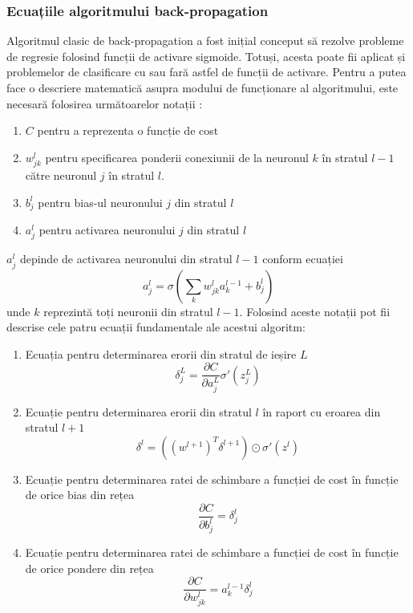 \subsubsection*{Ecuațiile algoritmului back-propagation}
Algoritmul clasic de back-propagation a fost inițial conceput să rezolve probleme de regresie folosind funcții de activare sigmoide. Totuși, acesta poate fii aplicat și problemelor de clasificare cu sau fară astfel de funcții de activare. Pentru a putea face o descriere matematică asupra modului de funcționare al algoritmului, este necesară folosirea următoarelor notații \cite{neuralnetbook:2015}:
\begin{enumerate}
\item $C$ pentru a reprezenta o funcție de cost
\item $w_{jk}^l$ pentru specificarea ponderii conexiunii de la neuronul $k$ în stratul $l-1$ către neuronul $j$ în stratul $l$.
\item $b_j^l$ pentru bias-ul neuronului $j$ din stratul $l$
\item $a_j^l$ pentru activarea neuronului $j$ din stratul $l$
\end{enumerate}
$a_j^l$ depinde de activarea neuronului din stratul $l-1$ conform ecuației
\begin{equation}
a_j^l=\sigma(\sum_k w_{jk}^l a_k^{l-1} + b_j^l)
\end{equation}
unde $k$ reprezintă toți neuronii din stratul $l-1$. Folosind aceste notații pot fii descrise cele patru ecuații fundamentale ale acestui algoritm:
\begin{enumerate}
\item Ecuația pentru determinarea erorii din stratul de ieșire $L$
\begin{equation}
\delta_j^L=\frac{\partial C}{\partial a_j^L}\sigma'(z_j^L)
\label{eq:out-err}
\end{equation}
\item Ecuație pentru determinarea erorii din stratul $l$ în raport cu eroarea din stratul $l+1$
\begin{equation}
\delta^l = ((w^{l+1})^T \delta^{l+1}) \odot \sigma'(z^l)
\label{eq:back-prop-err}
\end{equation}
\item Ecuație pentru determinarea ratei de schimbare a funcției de cost în funcție de orice bias din rețea
\begin{equation}
\frac{\partial C}{\partial b^l_j} = \delta^l_j
\label{eq:cost-w}
\end{equation}
\item Ecuație pentru determinarea ratei de schimbare a funcției de cost în funcție de orice pondere din rețea
\begin{equation}
\frac{\partial C}{\partial w^l_{jk}} = a^{l-1}_k \delta^l_j
\label{eq:cost-b}
\end{equation}
\end{enumerate}

